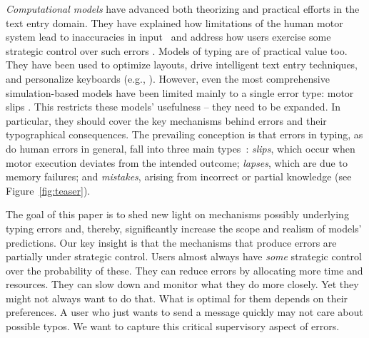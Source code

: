 \emph{Computational models} have advanced both theorizing and practical efforts in the text entry domain.
They have explained how limitations of the human motor system lead to inaccuracies in input~\cite{zhai2004characterizing} and address how users exercise some strategic control over such errors \cite{guiard2015mathematical}.
Models of typing are of practical value too.
They have been used to optimize layouts, drive intelligent text entry techniques,  and personalize keyboards (e.g., \cite{bi2013bayesian,weir2014uncertain,zhai2000metropolis}).
However, even the most comprehensive simulation-based models have been limited mainly to a single error type: motor slips \cite{jokinen2017modelling,jokinen2021touchscreen, shi2024crtypist}.
%
This restricts these models' usefulness -- they need to be expanded.
In particular, they should cover the key mechanisms behind errors and their typographical consequences. 
The prevailing conception is that errors in typing, as do human errors in general, fall into three main types~\cite{reason1990human}: \textit{slips}, which occur when motor execution deviates from the intended outcome; \textit{lapses}, which are due to memory failures; and \textit{mistakes}, arising from incorrect or partial knowledge (see Figure~\ref{fig:teaser}).
%


The goal of this paper is to shed new light on mechanisms possibly underlying typing errors and, thereby, significantly increase the scope and realism of models' predictions. 
%
Our key insight is that the mechanisms that produce errors are partially under strategic control. 
Users almost always have \emph{some} strategic control over the probability of these.
They can reduce errors by allocating more time and resources. 
They can slow down and monitor what they do more closely.
Yet they might not always want to do that.
What is optimal for them depends on their preferences.
A user who just wants to send a message quickly may not care about possible typos. 
%
We want to capture this critical supervisory aspect of errors.

